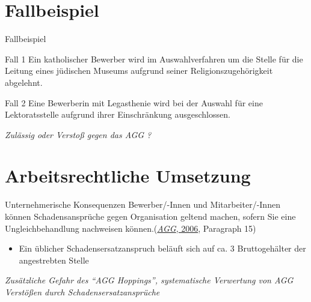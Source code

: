 \documentclass[
  10pt,
  ngerman,
  ignorenonframetext,
]{beamer}
\providecommand{\tightlist}{%
  \setlength{\itemsep}{0pt}\setlength{\parskip}{0pt}}
\begin{document}
\hypertarget{fallbeispiel}{%
\section{Fallbeispiel}\label{fallbeispiel}}

\begin{frame}{Fallbeispiel}
\begin{block}{Fall 1}
\protect\hypertarget{fall-1}{}
Ein katholischer Bewerber wird im Auswahlverfahren um die Stelle für die
Leitung eines jüdischen Museums aufgrund seiner Religionszugehörigkeit
abgelehnt.
\end{block}

\begin{block}{Fall 2}
\protect\hypertarget{fall-2}{}
Eine Bewerberin mit Legasthenie wird bei der Auswahl für eine
Lektoratsstelle aufgrund ihrer Einschränkung ausgeschlossen.

\emph{Zulässig oder Verstoß gegen das AGG ?}
\end{block}
\end{frame}

\hypertarget{arbeitsrechtliche-umsetzung}{%
\section{Arbeitsrechtliche
Umsetzung}\label{arbeitsrechtliche-umsetzung}}

\begin{frame}{Unternehmerische Konsequenzen}
\protect\hypertarget{unternehmerische-konsequenzen}{}
Bewerber/-Innen und Mitarbeiter/-Innen können Schadensansprüche gegen
Organisation geltend machen, sofern Sie eine Ungleichbehandlung
nachweisen können.(\protect\hyperlink{ref-agg}{\emph{AGG}, 2006},
Paragraph 15)

\begin{itemize}
\tightlist
\item
  Ein üblicher Schadensersatzanspruch beläuft sich auf ca. 3
  Bruttogehälter der angestrebten Stelle
\end{itemize}

\emph{Zusätzliche Gefahr des ``AGG Hoppings'', systematische Verwertung
von AGG Verstößen durch Schadensersatzansprüche}
\end{frame}
\end{document}
